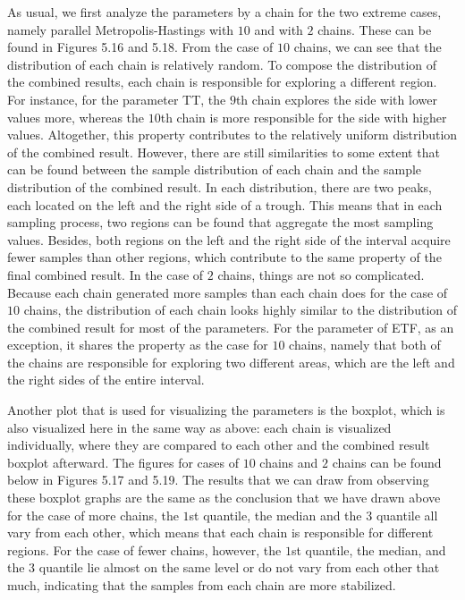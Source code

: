 As usual, we first analyze the parameters by a chain for the two extreme cases, namely parallel Metropolis-Hastings with $10$ and with $2$ chains. These can be found in Figures 5.16 and 5.18. From the case of $10$ chains, we can see that the distribution of each chain is relatively random. To compose the distribution of the combined results, each chain is responsible for exploring a different region. For instance, for the parameter TT, the $9$th chain explores the side with lower values more, whereas the $10$th chain is more responsible for the side with higher values. Altogether, this property contributes to the relatively uniform distribution of the combined result. However, there are still similarities to some extent that can be found between the sample distribution of each chain and the sample distribution of the combined result. In each distribution, there are two peaks, each located on the left and the right side of a trough. This means that in each sampling process, two regions can be found that aggregate the most sampling values. Besides, both regions on the left and the right side of the interval acquire fewer samples than other regions, which contribute to the same property of the final combined result. In the case of $2$ chains, things are not so complicated. Because each chain generated more samples than each chain does for the case of $10$ chains, the distribution of each chain looks highly similar to the distribution of the combined result for most of the parameters. For the parameter of ETF, as an exception, it shares the property as the case for $10$ chains, namely that both of the chains are responsible for exploring two different areas, which are the left and the right sides of the entire interval.

Another plot that is used for visualizing the parameters is the boxplot, which is also visualized here in the same way as above: each chain is visualized individually, where they are compared to each other and the combined result boxplot afterward. The figures for cases of $10$ chains and $2$ chains can be found below in Figures 5.17 and 5.19. The results that we can draw from observing these boxplot graphs are the same as the conclusion that we have drawn above for the case of more chains, the $1$st quantile, the median and the $3$ quantile all vary from each other, which means that each chain is responsible for different regions. For the case of fewer chains, however, the $1$st quantile, the median, and the $3$ quantile lie almost on the same level or do not vary from each other that much, indicating that the samples from each chain are more stabilized. 


